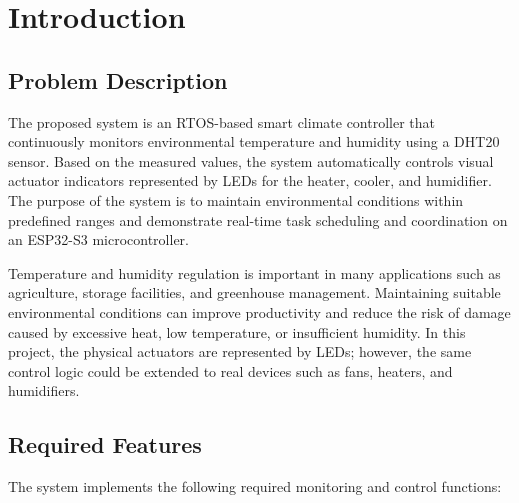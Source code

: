 \section{Introduction}
\subsection{Problem Description}

The proposed system is an RTOS-based smart climate controller that continuously monitors environmental temperature and
humidity using a DHT20 sensor. Based on the measured values, the system automatically controls visual actuator
indicators represented by LEDs for the heater, cooler, and humidifier. The purpose of the system is to maintain
environmental conditions within predefined ranges and demonstrate real-time task scheduling and coordination on an
ESP32-S3 microcontroller.

Temperature and humidity regulation is important in many applications such as agriculture, storage facilities, and
greenhouse management. Maintaining suitable environmental conditions can improve productivity and reduce the risk of
damage caused by excessive heat, low temperature, or insufficient humidity. In this project, the physical actuators are
represented by LEDs; however, the same control logic could be extended to real devices such as fans, heaters, and
humidifiers.

\subsection{Required Features}

The system implements the following required monitoring and control functions:


